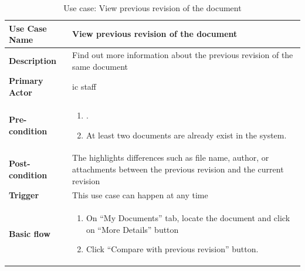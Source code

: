 \begin{table}
	\centering
	\caption{Use case: View previous revision of the document}
	\begin{tabular}{|l|L{9cm}|}
		\hline
		\textbf{Use Case Name} & View previous revision of the document \\
		\hline
		
		\textbf{Description} & Find out more information about the previous revision of the same document \\
		\textbf{Primary Actor} & \gls{ic} staff \\
		\textbf{Pre-condition} & 
		\begin{enumerate}
			\item \alreadylogin.
			\item At least two documents are already exist in the system.
		\end{enumerate} \\
		\textbf{Post-condition} & The highlights differences such as file name, author, or attachments between the previous revision and the current revision \\
		\textbf{Trigger} & This use case can happen at any time \\
		\textbf{Basic flow} & 
		\begin{enumerate}
			\item On \enquote{My Documents} tab, locate the document and click on \enquote{More Details} button
			\item Click \enquote{Compare with previous revision} button.
		\end{enumerate} \\
		\hline
	\end{tabular}
\end{table}

